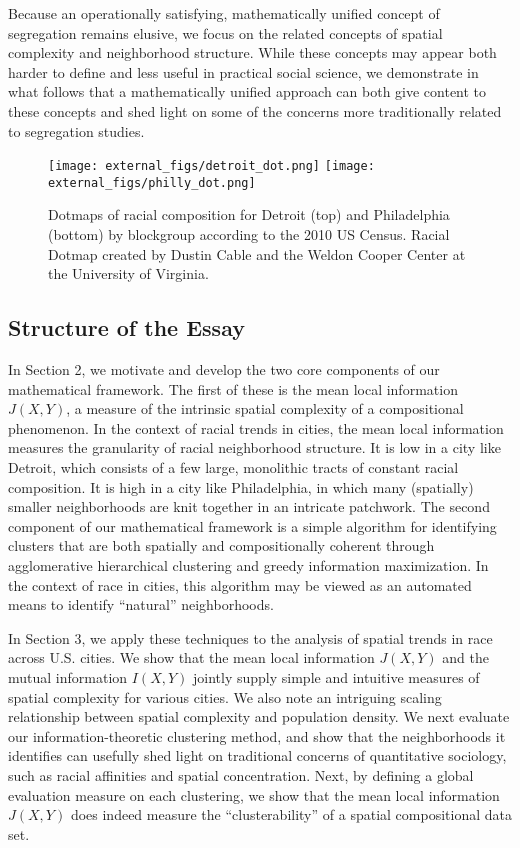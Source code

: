 	Because an operationally satisfying, mathematically unified concept of segregation remains elusive, we focus on the related concepts of spatial complexity and neighborhood structure. While these concepts may appear both harder to define and less useful in practical social science, we demonstrate in what follows that a mathematically unified approach can both give content to these concepts and shed light on some of the concerns more traditionally related to segregation studies. 

	\begin{figure}
	\centering
		\texttt{[image: external\_figs/detroit\_dot.png]}
		\texttt{[image: external\_figs/philly\_dot.png]}
		\caption{Dotmaps of racial composition for Detroit (top) and Philadelphia (bottom) by blockgroup according to the 2010 US Census. Racial Dotmap created by Dustin Cable and the Weldon Cooper Center at the University of Virginia.} 
		\label{fig:info_cross}
	\end{figure}	

\subsection{Structure of the Essay}
	In Section 2, we motivate and develop the two core components of our mathematical framework. The first of these is the mean local information $J(X,Y)$, a measure of the intrinsic spatial complexity of a compositional phenomenon. In the context of racial trends in cities, the mean local information measures the granularity of racial neighborhood structure. It is low in a city like Detroit, which consists of a few large, monolithic tracts of constant racial composition. It is high in a city like Philadelphia, in which many (spatially) smaller neighborhoods are knit together in an intricate patchwork. The second component of our mathematical framework is a simple algorithm for identifying clusters that are both spatially and compositionally coherent through agglomerative hierarchical clustering and greedy information maximization. In the context of race in cities, this algorithm may be viewed as an automated means to identify ``natural'' neighborhoods. 

	In Section 3, we apply these techniques to the analysis of spatial trends in race across U.S. cities. We show that the mean local information $J(X,Y)$ and the mutual information $I(X,Y)$ jointly supply simple and intuitive measures of spatial complexity for various cities. We also note an intriguing scaling relationship between spatial complexity and population density. We next evaluate our information-theoretic clustering method, and show that the neighborhoods it identifies can usefully shed light on traditional concerns of quantitative sociology, such as racial affinities and spatial concentration. Next, by defining a global evaluation measure on each clustering, we show that the mean local information $J(X,Y)$ does indeed measure the ``clusterability'' of a spatial compositional data set. 

